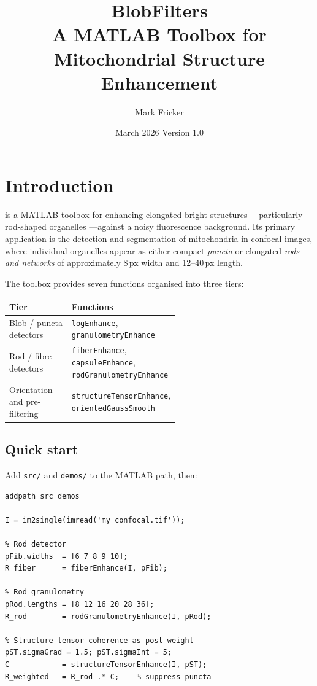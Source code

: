 \documentclass[a4paper, justified]{tufte-book}
\title{BlobFilters\\[0.5ex]
       \large A MATLAB Toolbox for Mitochondrial Structure Enhancement}
\author{Mark Fricker}
\date{March 2026 \quad\textbullet\quad Version 1.0}
\begin{document}
\maketitle
\tableofcontents

\chapter{Introduction}
\label{ch:intro}

 is a MATLAB toolbox for enhancing elongated bright
structures--- particularly rod-shaped organelles ---against a noisy fluorescence
background. Its primary application is the detection and segmentation of
mitochondria in confocal images, where individual organelles appear as either
compact \emph{puncta} or elongated \emph{rods and networks} of approximately
8\,px width and 12--40\,px length.

The toolbox provides seven functions organised into three tiers:

\bigskip
\begin{tabular}{lp{0.55\linewidth}}
\toprule
\textbf{Tier} & \textbf{Functions} \\
\midrule
Blob / puncta detectors  & \texttt{logEnhance}, \texttt{granulometryEnhance} \\
Rod / fibre detectors    & \texttt{fiberEnhance}, \texttt{capsuleEnhance},
                           \texttt{rodGranulometryEnhance} \\
Orientation and pre-filtering
                         & \texttt{structureTensorEnhance},
                           \texttt{orientedGaussSmooth} \\
\bottomrule
\end{tabular}

\section{Quick start}

Add \texttt{src/} and \texttt{demos/} to the MATLAB path, then:

\begin{lstlisting}
addpath src demos

I = im2single(imread('my_confocal.tif'));

% Rod detector
pFib.widths  = [6 7 8 9 10];
R_fiber      = fiberEnhance(I, pFib);

% Rod granulometry
pRod.lengths = [8 12 16 20 28 36];
R_rod        = rodGranulometryEnhance(I, pRod);

% Structure tensor coherence as post-weight
pST.sigmaGrad = 1.5; pST.sigmaInt = 5;
C            = structureTensorEnhance(I, pST);
R_weighted   = R_rod .* C;    % suppress puncta
\end{lstlisting}
\end{document}
